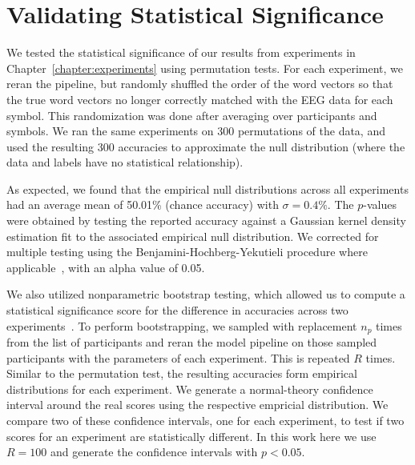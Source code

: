 \section{Validating Statistical Significance}
We tested the statistical significance of our results from experiments in 
Chapter~\ref{chapter:experiments} using permutation tests. For each experiment, 
we reran the pipeline, but randomly shuffled the order of the word vectors so 
that the true word vectors no longer correctly matched with the EEG data for 
each symbol. This randomization was done after averaging over participants and 
symbols. We ran the same experiments on 300 permutations of the data, and used 
the resulting 300 \tvt accuracies to approximate the null distribution (where 
the data and labels have no statistical relationship). 

As expected, we found that the empirical null distributions across all 
experiments had an average mean of 50.01\% (chance accuracy) with $\sigma = 
0.4\%$. The $p$-values were obtained by testing the reported accuracy against a 
Gaussian kernel density estimation fit to the associated empirical null 
distribution. We corrected for multiple testing using the 
Benjamini-Hochberg-Yekutieli procedure where 
applicable~\cite{benjamini2001control}, with an alpha value of 0.05.

We also utilized nonparametric bootstrap testing, which allowed us to compute a 
statistical significance score for the difference in \tvt accuracies across two 
experiments~\cite{davison1997bootstrap}. To perform bootstrapping, we sampled 
with replacement $n_p$ times from the list of participants and reran the model 
pipeline on those sampled participants with the parameters of each experiment.  
This is repeated $R$ times.  Similar to the permutation test, the resulting 
\tvt accuracies form empirical distributions for each experiment. We generate a 
normal-theory confidence interval around the real \tvt scores using the 
respective empricial distribution. We compare two of these confidence 
intervals, one for each experiment, to test if two \tvt scores for an 
experiment are statistically different. In this work here we use $R = 100$ and 
generate the confidence intervals with $p < 0.05$.
